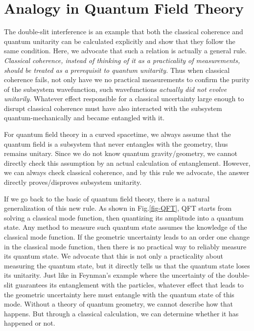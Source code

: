 \documentclass[aps,showpacs,twocolumn,floats,prd,superscriptaddress,nofootinbib]{revtex4-1}
\begin{document}
\section{Analogy in Quantum Field Theory}
\label{sec-QFT}

The double-slit interference is an example that both the classical coherence and quantum unitarity can be calculated explicitly and show that they follow the same condition.
Here, we advocate that such a relation is actually a general rule.
{\it Classical coherence, instead of thinking of it as a practicality of measurements, should be treated as a prerequisit to quantum unitarity.} 
Thus when classical coherence fails, not only have we no practical measurements to confirm the purity of the subsystem wavefunction, such wavefunctions {\it actually did not evolve unitarily.}
Whatever effect responsible for a classical uncertainty large enough to disrupt classical coherence must have also interacted with the subsystem quantum-mechanically and became entangled with it.

For quantum field theory in a curved spacetime, we always assume that the quantum field is a subsystem that never entangles with the geometry, thus remains unitary.
Since we do not know quantum gravity/geometry, we cannot directly check this assumption by an actual calculation of entanglement.
However, we can always check classical coherence, and by this rule we advocate, the answer directly proves/disproves subsystem unitarity.

If we go back to the basic of quantum field theory, there is a natural generalization of this new rule. 
As shown in Fig.\ref{fig-QFT}, QFT starts from solving a classical mode function, then quantizing its amplitude into a quantum state. 
Any method to measure such quantum state assumes the knowledge of the classical mode function. 
If the geometric uncertainty leads to an order one change in the classical mode function, then there is no practical way to reliably measure its quantum state. 
We advocate that this is not only a practicality about measuring the quantum state, but it directly tells us that the quantum state loses its unitarity. 
Just like in Feynman's example where the uncertainty of the double-slit guarantees its entanglement with the particles, whatever effect that leads to the geometric uncertainty here must entangle with the quantum state of this mode. 
Without a theory of quantum geometry, we cannot describe how that happens. 
But through a classical calculation, we can determine whether it has happened or not.
\end{document}
